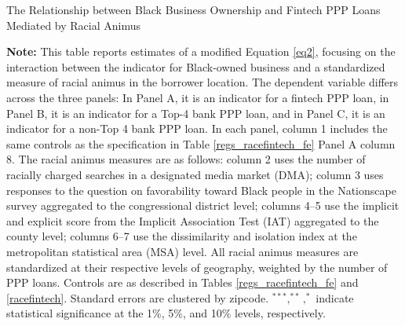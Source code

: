 \documentclass[11pt]{article}
\begin{document}
\newpage
    \begin{table}[H]
        \caption{The Relationship between Black Business Ownership and Fintech PPP Loans Mediated by Racial Animus} \label{regs_animus}
  	    \begin{adjustbox}{width=\linewidth, center}
            
  	    \end{adjustbox}
 
        \begin{adjustbox}{width=\linewidth, center}
            
        \end{adjustbox}
         
        \begin{adjustbox}{width=\linewidth, center}
            
        \end{adjustbox}

        \begin{minipage}{\linewidth} \medskip
            \footnotesize{{\bf Note: }This table reports estimates of a modified Equation \ref{eq2}, focusing on the interaction between the indicator for Black-owned business and a standardized measure of racial animus in the borrower location. The dependent variable differs across the three panels: In Panel A, it is an indicator for a fintech PPP loan, in Panel B, it is an indicator for a Top-4 bank PPP loan, and in Panel C, it is an indicator for a non-Top 4 bank PPP loan. In each panel, column 1 includes the same controls as the specification in Table \ref{regs_racefintech_fe} Panel A column 8. The racial animus measures are as follows: column 2 uses the number of racially charged searches in a designated media market (DMA); column 3 uses responses to the question on favorability toward Black people in the Nationscape survey aggregated to the congressional district level; columns 4--5 use the implicit and explicit score from the Implicit Association Test (IAT) aggregated to the county level; columns 6--7 use the dissimilarity and isolation index at the metropolitan statistical area (MSA) level. All racial animus measures are standardized at their respective levels of geography, weighted by the number of PPP loans.  Controls are as described in Tables \ref{regs_racefintech_fe} and \ref{racefintech}. Standard errors are clustered by zipcode. $^{***}, ^{**}, ^{*}$ indicate statistical significance at the 1\%, 5\%, and 10\% levels, respectively.}
        \end{minipage}
    \end{table}
\end{document}

